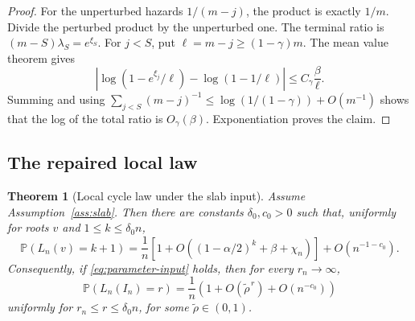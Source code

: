 \documentclass[11pt]{article}
\newcommand{\Pp}{\mathbb P}
\newcommand{\1}{\mathbf 1}
\newtheorem{theorem}{Theorem}[section]
\theoremstyle{remark}
\begin{document}
\begin{proof}
For the unperturbed hazards $1/(m-j)$, the product is exactly $1/m$.
Divide the perturbed product by the unperturbed one.  The terminal ratio is
$(m-S)\lambda_S=e^{\xi_S}$.  For $j<S$, put $\ell=m-j\ge(1-\gamma)m$.
The mean value theorem gives
\[
 \left|\log(1-e^{\xi_j}/\ell)-\log(1-1/\ell)\right|
 \le C_\gamma\frac{\beta}{\ell}.
\]
Summing and using
$\sum_{j<S}(m-j)^{-1}\le\log(1/(1-\gamma))+O(m^{-1})$ shows that the log of
the total ratio is $O_\gamma(\beta)$.  Exponentiation proves the claim.
\end{proof}

\subsection{The repaired local law}

\begin{theorem}[Local cycle law under the slab input]\label{thm:local-conditional}
Assume Assumption~\ref{ass:slab}.  Then there are constants
$\delta_0,c_0>0$ such that, uniformly for roots $v$ and
$1\le k\le\delta_0n$,
\begin{equation}\label{eq:local-conditional}
 \Pp(L_n(v)=k+1)
 =\frac1n\left[1+O\left((1-\alpha/2)^k+\beta+\chi_n\right)\right]
 +O(n^{-1-c_0}).
\end{equation}
Consequently, if \eqref{eq:parameter-input} holds, then for every
$r_n\to\infty$,
\[
 \Pp(L_n(I_n)=r)=\frac1n\left(1+O(\widetilde\rho^{\,r})+O(n^{-c_0})\right)
\]
uniformly for $r_n\le r\le\delta_0n$, for some
$\widetilde\rho\in(0,1)$.
\end{theorem}
\end{document}
